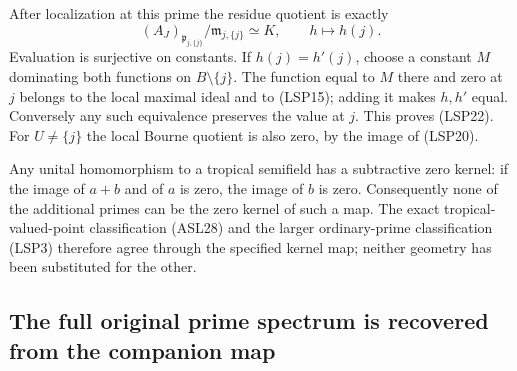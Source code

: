 After localization at this prime the residue quotient is exactly
\begin{equation}\tag{LSP22}
 (A_J)_{\mathfrak p_{j,\{j\}}}/\mathfrak m_{j,\{j\}}\simeq K,
 \qquad h\longmapsto h(j).
\end{equation}
Evaluation is surjective on constants. If $h(j)=h'(j)$, choose a
constant $M$ dominating both functions on $B\setminus\{j\}$.
The function equal to $M$ there and zero at $j$ belongs to the local
maximal ideal and to (LSP15); adding it makes $h,h'$ equal. Conversely
any such equivalence preserves the value at $j$. This proves (LSP22).
For $U\ne\{j\}$ the local Bourne quotient is also zero, by the
image of (LSP20).

Any unital homomorphism to a tropical semifield has a subtractive
zero kernel: if the image of $a+b$ and of $a$ is zero, the image
of $b$ is zero. Consequently none of the additional primes can be
the zero kernel of such a map. The exact tropical-valued-point
classification (ASL28) and the larger ordinary-prime classification
(LSP3) therefore agree through the specified kernel map; neither
geometry has been substituted for the other.

\subsection{The full original prime spectrum is recovered from the companion map}

